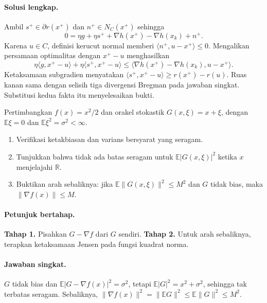 \paragraph{Solusi lengkap.}
\label{orig03:ps04:solution:0002}
Ambil $s^+\in\partial r(x^+)$ dan $n^+\in N_C(x^+)$ sehingga
\[
 0=\eta g+\eta s^++\nabla h(x^+)-\nabla h(x_k)+n^+.
\]
Karena $u\in C$, definisi kerucut normal memberi
$\langle n^+,u-x^+\rangle\le0$. Mengalikan persamaan optimalitas dengan
$x^+-u$ menghasilkan
\[
 \eta\langle g,x^+-u\rangle+\eta\langle s^+,x^+-u\rangle
 \le \langle\nabla h(x^+)-\nabla h(x_k),u-x^+\rangle.
\]
Ketaksamaan subgradien menyatakan
$\langle s^+,x^+-u\rangle\ge r(x^+)-r(u)$. Ruas kanan sama dengan selisih
tiga divergensi Bregman pada jawaban singkat. Substitusi kedua fakta itu
menyelesaikan bukti.

\begin{exercise}
\label{orig03:ps04:exercise:0003}
Pertimbangkan $f(x)=x^2/2$ dan orakel stokastik
$G(x,\xi)=x+\xi$, dengan $\mathbb E\xi=0$ dan
$\mathbb E\xi^2=\sigma^2<\infty$.

\begin{enumerate}
  \item Verifikasi ketakbiasan dan varians bersyarat yang seragam.
  \item Tunjukkan bahwa tidak ada batas seragam untuk
  $\mathbb E|G(x,\xi)|^2$ ketika $x$ menjelajahi $\mathbb R$.
  \item Buktikan arah sebaliknya: jika
  $\mathbb E\lVert G(x,\xi)\rVert^2\le M^2$ dan $G$ tidak bias, maka
  $\lVert\nabla f(x)\rVert\le M$.
\end{enumerate}
\end{exercise}

\paragraph{Petunjuk bertahap.}
\label{orig03:ps04:hint:0003}
\textbf{Tahap 1.} Pisahkan $G-\nabla f$ dari $G$ sendiri.
\textbf{Tahap 2.} Untuk arah sebaliknya, terapkan ketaksamaan Jensen pada
fungsi kuadrat norma.

\paragraph{Jawaban singkat.}
\label{orig03:ps04:answer:0003}
$G$ tidak bias dan
$\mathbb E|G-\nabla f(x)|^2=\sigma^2$, tetapi
$\mathbb E|G|^2=x^2+\sigma^2$, sehingga tak terbatas seragam. Sebaliknya,
$\lVert\nabla f(x)\rVert^2=\lVert\mathbb E G\rVert^2
\le\mathbb E\lVert G\rVert^2\le M^2$.

